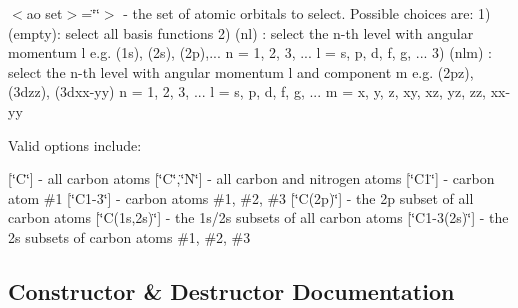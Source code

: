 $<$ao set$>$=\char`\"{}\char`\"{}$>$ -\/ the set of atomic orbitals to select. Possible choices are\+: 1) \textquotesingle{}\textquotesingle{} (empty)\+: select all basis functions 2) \textquotesingle{}(nl)\textquotesingle{} \+: select the n-\/th level with angular momentum l e.\+g. \textquotesingle{}(1s)\textquotesingle{}, \textquotesingle{}(2s)\textquotesingle{}, \textquotesingle{}(2p)\textquotesingle{},... n = 1, 2, 3, ... l = \textquotesingle{}s\textquotesingle{}, \textquotesingle{}p\textquotesingle{}, \textquotesingle{}d\textquotesingle{}, \textquotesingle{}f\textquotesingle{}, \textquotesingle{}g\textquotesingle{}, ... 3) \textquotesingle{}(nlm)\textquotesingle{} \+: select the n-\/th level with angular momentum l and component m e.\+g. \textquotesingle{}(2pz)\textquotesingle{}, \textquotesingle{}(3dzz)\textquotesingle{}, \textquotesingle{}(3dxx-\/yy)\textquotesingle{} n = 1, 2, 3, ... l = \textquotesingle{}s\textquotesingle{}, \textquotesingle{}p\textquotesingle{}, \textquotesingle{}d\textquotesingle{}, \textquotesingle{}f\textquotesingle{}, \textquotesingle{}g\textquotesingle{}, ... m = \textquotesingle{}x\textquotesingle{}, \textquotesingle{}y\textquotesingle{}, \textquotesingle{}z\textquotesingle{}, \textquotesingle{}xy\textquotesingle{}, \textquotesingle{}xz\textquotesingle{}, \textquotesingle{}yz\textquotesingle{}, \textquotesingle{}zz\textquotesingle{}, \textquotesingle{}xx-\/yy\textquotesingle{}

Valid options include\+:

\mbox{[}\char`\"{}\+C\char`\"{}\mbox{]} -\/ all carbon atoms \mbox{[}\char`\"{}\+C\char`\"{},\char`\"{}\+N\char`\"{}\mbox{]} -\/ all carbon and nitrogen atoms \mbox{[}\char`\"{}\+C1\char`\"{}\mbox{]} -\/ carbon atom \#1 \mbox{[}\char`\"{}\+C1-\/3\char`\"{}\mbox{]} -\/ carbon atoms \#1, \#2, \#3 \mbox{[}\char`\"{}\+C(2p)\char`\"{}\mbox{]} -\/ the 2p subset of all carbon atoms \mbox{[}\char`\"{}\+C(1s,2s)\char`\"{}\mbox{]} -\/ the 1s/2s subsets of all carbon atoms \mbox{[}\char`\"{}\+C1-\/3(2s)\char`\"{}\mbox{]} -\/ the 2s subsets of carbon atoms \#1, \#2, \#3 

\subsection{Constructor \& Destructor Documentation}
\mbox{\label{classforte_1_1_a_o_subspace_aa7017771aa20fc9e5b8c18df5409dec7}} 
